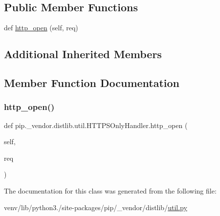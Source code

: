 \subsection*{Public Member Functions}
\begin{DoxyCompactItemize}
\item 
def \hyperlink{classpip_1_1__vendor_1_1distlib_1_1util_1_1HTTPSOnlyHandler_ae3cd4e9ba0ce4c2a27ed2dd940ea81de}{http\+\_\+open} (self, req)
\end{DoxyCompactItemize}
\subsection*{Additional Inherited Members}


\subsection{Member Function Documentation}
\mbox{\label{classpip_1_1__vendor_1_1distlib_1_1util_1_1HTTPSOnlyHandler_ae3cd4e9ba0ce4c2a27ed2dd940ea81de}} 
\subsubsection{\texorpdfstring{http\+\_\+open()}{http\_open()}}
{\footnotesize\ttfamily def pip.\+\_\+vendor.\+distlib.\+util.\+H\+T\+T\+P\+S\+Only\+Handler.\+http\+\_\+open (\begin{DoxyParamCaption}\item[{}]{self,  }\item[{}]{req }\end{DoxyParamCaption})}



The documentation for this class was generated from the following file\+:\begin{DoxyCompactItemize}
\item 
venv/lib/python3./site-\/packages/pip/\+\_\+vendor/distlib/\hyperlink{pip_2__vendor_2distlib_2util_8py}{util.\+py}\end{DoxyCompactItemize}
